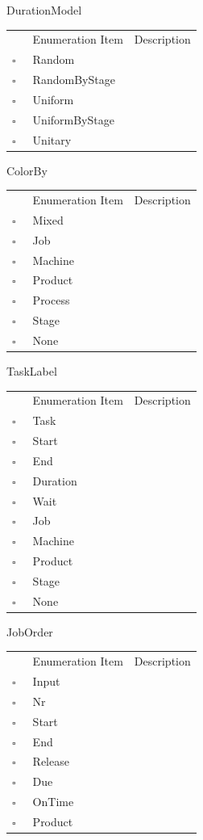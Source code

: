DurationModel   
\begin{longtable}{llp{8cm}}
& Enumeration Item & Description \\
$\square$\ & Random &  \\
$\square$\ & RandomByStage &  \\
$\square$\ & Uniform &  \\
$\square$\ & UniformByStage &  \\
$\square$\ & Unitary &  \\
\end{longtable}
ColorBy   
\begin{longtable}{llp{8cm}}
& Enumeration Item & Description \\
$\square$\ & Mixed &  \\
$\square$\ & Job &  \\
$\square$\ & Machine &  \\
$\square$\ & Product &  \\
$\square$\ & Process &  \\
$\square$\ & Stage &  \\
$\square$\ & None &  \\
\end{longtable}
TaskLabel   
\begin{longtable}{llp{8cm}}
& Enumeration Item & Description \\
$\square$\ & Task &  \\
$\square$\ & Start &  \\
$\square$\ & End &  \\
$\square$\ & Duration &  \\
$\square$\ & Wait &  \\
$\square$\ & Job &  \\
$\square$\ & Machine &  \\
$\square$\ & Product &  \\
$\square$\ & Stage &  \\
$\square$\ & None &  \\
\end{longtable}
JobOrder   
\begin{longtable}{llp{8cm}}
& Enumeration Item & Description \\
$\square$\ & Input &  \\
$\square$\ & Nr &  \\
$\square$\ & Start &  \\
$\square$\ & End &  \\
$\square$\ & Release &  \\
$\square$\ & Due &  \\
$\square$\ & OnTime &  \\
$\square$\ & Product &  \\
\end{longtable}
